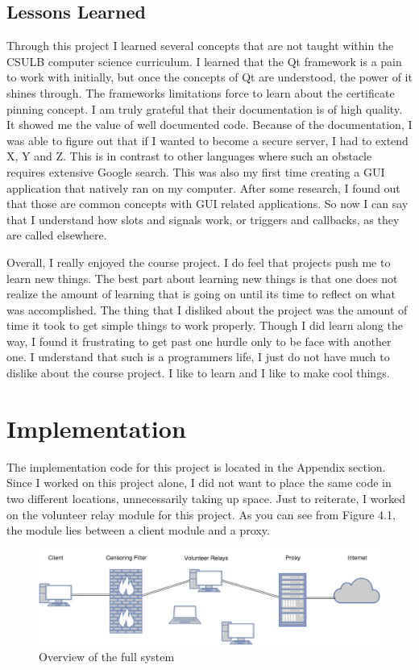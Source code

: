 \documentclass[12pt,a4paper]{report}
\begin{document}
	 
	\section{Lessons Learned}
	Through this project I learned several concepts that are not taught within the CSULB computer science curriculum. I learned that the Qt framework is a pain to work with initially, but once the concepts of Qt are understood, the power of it shines through. The frameworks limitations force to learn about the certificate pinning concept. I am truly grateful that their documentation is of high quality. It showed me the value of well documented code. Because of the documentation, I was able to figure out that if I wanted to become a secure server, I had to extend X, Y and Z. This is in contrast to other languages where such an obstacle requires extensive Google search. This was also my first time creating a GUI application that natively ran on my computer. After some research, I found out that those are common concepts with GUI related applications. So now I can say that I understand how slots and signals work, or triggers and callbacks, as they are called elsewhere.
	
	Overall, I really enjoyed the course project. I do feel that projects push me to learn new things. The best part about learning new things is that one does not realize the amount of learning that is going on until its time to reflect on what was accomplished. The thing that I disliked about the project was the amount of time it took to get simple things to work properly. Though I did learn along the way, I found it frustrating to get past one hurdle only to be face with another one. I understand that such is a programmers life, I just do not have much to dislike about the course project. I like to learn and I like to make cool things.  

	
\chapter{Implementation}
 The implementation code for this project is located in the Appendix section. Since I worked on this project alone, I did not want to place the same code in two different locations, unnecessarily taking up space. Just to reiterate, I worked on the volunteer relay module for this project. As you can see from Figure 4.1, the module lies between a client module and a proxy.  
 
\begin{figure}[h]
 	\caption{Overview of the full system}
	\includegraphics[width=\textwidth]{BigPicture.png}
\end{figure}
\end{document}
